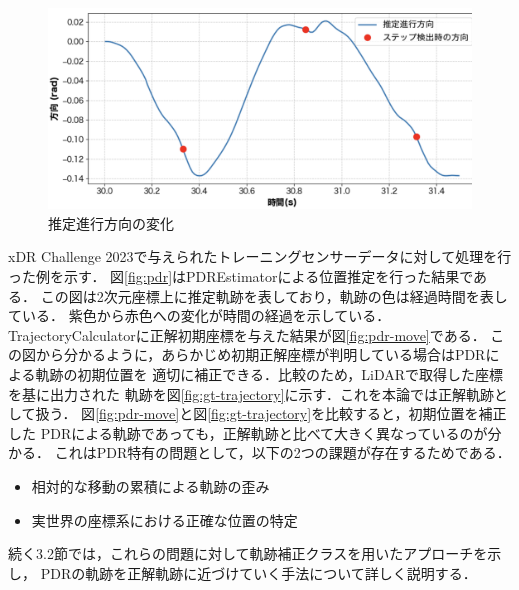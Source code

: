 \begin{figure}[H]
	\centering
	\includegraphics[width=\linewidth]{../image/step_timing_angle.jpg}
	\caption{推定進行方向の変化}    \label{fig:step_timing}
\end{figure}


xDR Challenge 2023で与えられたトレーニングセンサーデータに対して処理を行った例を示す．
図\ref{fig:pdr}はPDREstimatorによる位置推定を行った結果である．
この図は2次元座標上に推定軌跡を表しており，軌跡の色は経過時間を表している．
紫色から赤色への変化が時間の経過を示している．
TrajectoryCalculatorに正解初期座標を与えた結果が図\ref{fig:pdr-move}である．
この図から分かるように，あらかじめ初期正解座標が判明している場合はPDRによる軌跡の初期位置を
適切に補正できる．比較のため，LiDARで取得した座標を基に出力された
軌跡を図\ref{fig:gt-trajectory}に示す．これを本論では正解軌跡として扱う．
図\ref{fig:pdr-move}と図\ref*{fig:gt-trajectory}を比較すると，初期位置を補正した
PDRによる軌跡であっても，正解軌跡と比べて大きく異なっているのが分かる．
これはPDR特有の問題として，以下の2つの課題が存在するためである．

\begin{itemize}
    \item 相対的な移動の累積による軌跡の歪み
    \item 実世界の座標系における正確な位置の特定
\end{itemize}


続く3.2節では，これらの問題に対して軌跡補正クラスを用いたアプローチを示し，
PDRの軌跡を正解軌跡に近づけていく手法について詳しく説明する．


